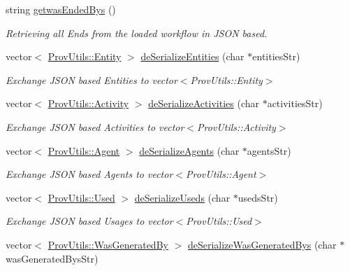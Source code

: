 \begin{DoxyCompactItemize}
string \hyperlink{class_in_di_prov_client_ab7946e8a31014d95bf03250b6b466bb1}{getwas\-Ended\-Bys} ()
\begin{DoxyCompactList}\small\item\em Retrieving all Ends from the loaded workflow in J\-S\-O\-N based. \end{DoxyCompactList}\item 
vector$<$ \hyperlink{struct_prov_utils_1_1_entity}{Prov\-Utils\-::\-Entity} $>$ \hyperlink{class_in_di_prov_client_af2de8cfed71d1340578e21794a32f1a1}{de\-Serialize\-Entities} (char $\ast$entities\-Str)
\begin{DoxyCompactList}\small\item\em Exchange J\-S\-O\-N based Entities to vector$<$\-Prov\-Utils\-::\-Entity$>$ \end{DoxyCompactList}\item 
vector$<$ \hyperlink{struct_prov_utils_1_1_activity}{Prov\-Utils\-::\-Activity} $>$ \hyperlink{class_in_di_prov_client_ae99802bda1135179aa50a4413ef3c4e6}{de\-Serialize\-Activities} (char $\ast$activities\-Str)
\begin{DoxyCompactList}\small\item\em Exchange J\-S\-O\-N based Activities to vector$<$\-Prov\-Utils\-::\-Activity$>$ \end{DoxyCompactList}\item 
vector$<$ \hyperlink{struct_prov_utils_1_1_agent}{Prov\-Utils\-::\-Agent} $>$ \hyperlink{class_in_di_prov_client_af3dd5119f070e70782d5d8cbeb15b3c4}{de\-Serialize\-Agents} (char $\ast$agents\-Str)
\begin{DoxyCompactList}\small\item\em Exchange J\-S\-O\-N based Agents to vector$<$\-Prov\-Utils\-::\-Agent$>$ \end{DoxyCompactList}\item 
vector$<$ \hyperlink{struct_prov_utils_1_1_used}{Prov\-Utils\-::\-Used} $>$ \hyperlink{class_in_di_prov_client_a6978eb897e437df621830f4859a79368}{de\-Serialize\-Useds} (char $\ast$useds\-Str)
\begin{DoxyCompactList}\small\item\em Exchange J\-S\-O\-N based Usages to vector$<$\-Prov\-Utils\-::\-Used$>$ \end{DoxyCompactList}\item 
vector$<$ \hyperlink{struct_prov_utils_1_1_was_generated_by}{Prov\-Utils\-::\-Was\-Generated\-By} $>$ \hyperlink{class_in_di_prov_client_afead00512a6bf04b3d134a3de1ab3909}{de\-Serialize\-Was\-Generated\-Bys} (char $\ast$was\-Generated\-Bys\-Str)

\end{DoxyCompactItemize}
